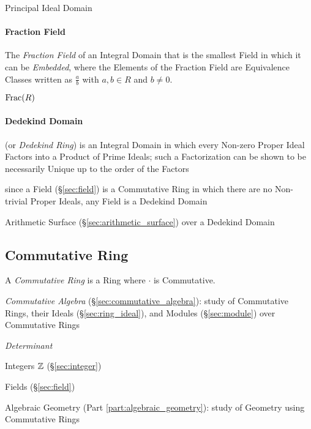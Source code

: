 \begin{itemize}
Principal Ideal Domain



\paragraph{Fraction Field}\label{sec:fraction_field}\hfill

The \emph{Fraction Field} of an Integral Domain that is the smallest Field in
which it can be \emph{Embedded}, where the Elements of the Fraction Field are
Equivalence Classes written as $\frac{a}{b}$ with $a, b \in R$ and $b \neq 0$.

$\mathrm{Frac}(R)$



\paragraph{Dedekind Domain}\label{sec:dedekind_domain}\hfill

(or \emph{Dedekind Ring}) is an Integral Domain in which every Non-zero Proper
Ideal Factors into a Product of Prime Ideals; such a Factorization can be shown
to be necessarily Unique up to the order of the Factors

since a Field (\S\ref{sec:field}) is a Commutative Ring in which there are no
Non-trivial Proper Ideals, any Field is a Dedekind Domain

\fist Arithmetic Surface (\S\ref{sec:arithmetic_surface}) over a Dedekind Domain



\subsection{Commutative Ring}\label{sec:commutative_ring}

A \emph{Commutative Ring} is a Ring where $\cdot$ is Commutative.

\fist \emph{Commutative Algebra} (\S\ref{sec:commutative_algebra}): study of
Commutative Rings, their Ideals (\S\ref{sec:ring_ideal}), and Modules
(\S\ref{sec:module}) over Commutative Rings

\emph{Determinant}

Integers $\mathbb{Z}$ (\S\ref{sec:integer})

Fields (\S\ref{sec:field})

Algebraic Geometry (Part \ref{part:algebraic_geometry}): study of
Geometry using Commutative Rings


\end{itemize}
